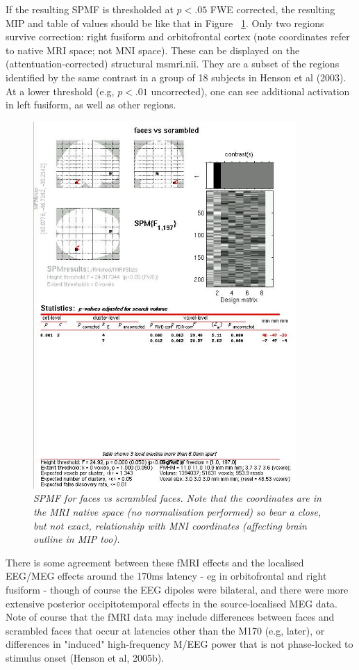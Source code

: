 If the resulting SPM{F} is thresholded at $p<.05$ FWE corrected, the resulting MIP and table of values should be like that in Figure ~\ref{fig_32_22}. Only two regions survive correction: right fusiform and orbitofrontal cortex (note coordinates refer to native MRI space; not MNI space). These can be displayed on the (attentuation-corrected) structural msmri.nii. They are a subset of the regions identified by the same contrast in a group of 18 subjects in Henson et al (2003). At a lower threshold (e.g, $p<.01$ uncorrected), one can see additional activation in left fusiform, as well as other regions.


\begin{figure}
\begin{center}
\includegraphics[width=100mm]{multimodal/figures/figure_32_22}
\caption{\em  SPM{F} for faces vs scrambled faces. Note that the coordinates are in the MRI native space (no normalisation performed) so bear a close, but not exact, relationship with MNI coordinates (affecting brain outline in MIP too).\label{fig_32_22}}
\end{center}
\end{figure}

There is some agreement between these fMRI effects and the localised EEG/MEG effects around the 170ms latency - eg in orbitofrontal and right fusiform - though of course the EEG dipoles were bilateral, and there were more extensive posterior occipitotemporal effects in the source-localised MEG data. Note of course that the fMRI data may include differences between faces and scrambled faces that occur at latencies other than the M170 (e.g, later), or differences in "induced" high-frequency M/EEG power that is not phase-locked to stimulus onset (Henson et al, 2005b).

